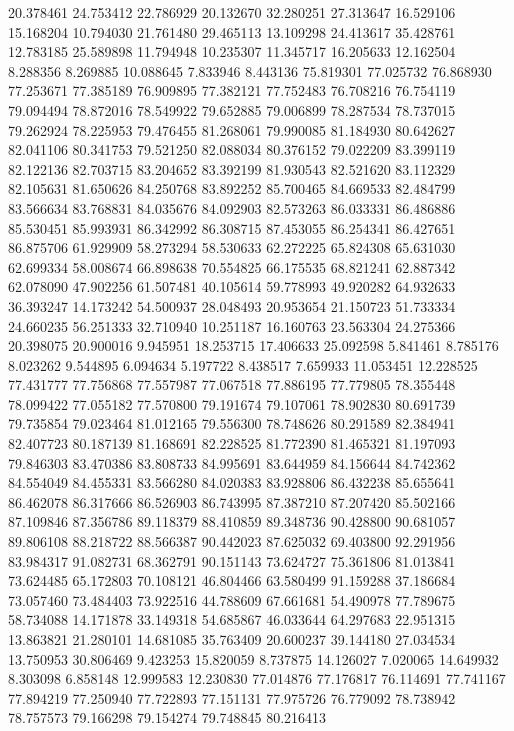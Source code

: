 20.378461
24.753412
22.786929
20.132670
32.280251
27.313647
16.529106
15.168204
10.794030
21.761480
29.465113
13.109298
24.413617
35.428761
12.783185
25.589898
11.794948
10.235307
11.345717
16.205633
12.162504
8.288356
8.269885
10.088645
7.833946
8.443136
75.819301
77.025732
76.868930
77.253671
77.385189
76.909895
77.382121
77.752483
76.708216
76.754119
79.094494
78.872016
78.549922
79.652885
79.006899
78.287534
78.737015
79.262924
78.225953
79.476455
81.268061
79.990085
81.184930
80.642627
82.041106
80.341753
79.521250
82.088034
80.376152
79.022209
83.399119
82.122136
82.703715
83.204652
83.392199
81.930543
82.521620
83.112329
82.105631
81.650626
84.250768
83.892252
85.700465
84.669533
82.484799
83.566634
83.768831
84.035676
84.092903
82.573263
86.033331
86.486886
85.530451
85.993931
86.342992
86.308715
87.453055
86.254341
86.427651
86.875706
61.929909
58.273294
58.530633
62.272225
65.824308
65.631030
62.699334
58.008674
66.898638
70.554825
66.175535
68.821241
62.887342
62.078090
47.902256
61.507481
40.105614
59.778993
49.920282
64.932633
36.393247
14.173242
54.500937
28.048493
20.953654
21.150723
51.733334
24.660235
56.251333
32.710940
10.251187
16.160763
23.563304
24.275366
20.398075
20.900016
9.945951
18.253715
17.406633
25.092598
5.841461
8.785176
8.023262
9.544895
6.094634
5.197722
8.438517
7.659933
11.053451
12.228525
77.431777
77.756868
77.557987
77.067518
77.886195
77.779805
78.355448
78.099422
77.055182
77.570800
79.191674
79.107061
78.902830
80.691739
79.735854
79.023464
81.012165
79.556300
78.748626
80.291589
82.384941
82.407723
80.187139
81.168691
82.228525
81.772390
81.465321
81.197093
79.846303
83.470386
83.808733
84.995691
83.644959
84.156644
84.742362
84.554049
84.455331
83.566280
84.020383
83.928806
86.432238
85.655641
86.462078
86.317666
86.526903
86.743995
87.387210
87.207420
85.502166
87.109846
87.356786
89.118379
88.410859
89.348736
90.428800
90.681057
89.806108
88.218722
88.566387
90.442023
87.625032
69.403800
92.291956
83.984317
91.082731
68.362791
90.151143
73.624727
75.361806
81.013841
73.624485
65.172803
70.108121
46.804466
63.580499
91.159288
37.186684
73.057460
73.484403
73.922516
44.788609
67.661681
54.490978
77.789675
58.734088
14.171878
33.149318
54.685867
46.033644
64.297683
22.951315
13.863821
21.280101
14.681085
35.763409
20.600237
39.144180
27.034534
13.750953
30.806469
9.423253
15.820059
8.737875
14.126027
7.020065
14.649932
8.303098
6.858148
12.999583
12.230830
77.014876
77.176817
76.114691
77.741167
77.894219
77.250940
77.722893
77.151131
77.975726
76.779092
78.738942
78.757573
79.166298
79.154274
79.748845
80.216413
